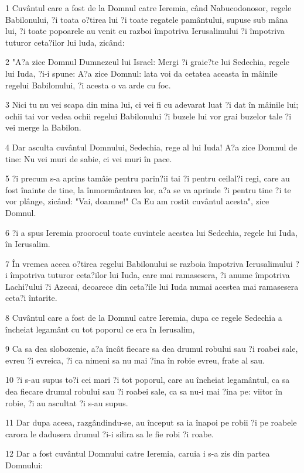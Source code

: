 \par 1 Cuvântul care a fost de la Domnul catre Ieremia, când Nabucodonosor, regele Babilonului, ?i toata o?tirea lui ?i toate regatele pamântului, supuse sub mâna lui, ?i toate popoarele au venit cu razboi împotriva Ierusalimului ?i împotriva tuturor ceta?ilor lui luda, zicând:
\par 2 "A?a zice Domnul Dumnezeul lui Israel: Mergi ?i graie?te lui Sedechia, regele lui Iuda, ?i-i spune: A?a zice Domnul: lata voi da cetatea aceasta în mâinile regelui Babilonului, ?i acesta o va arde cu foc.
\par 3 Nici tu nu vei scapa din mina lui, ci vei fi cu adevarat luat ?i dat în mâinile lui; ochii tai vor vedea ochii regelui Babilonului ?i buzele lui vor grai buzelor tale ?i vei merge la Babilon.
\par 4 Dar asculta cuvântul Domnului, Sedechia, rege al lui Iuda! A?a zice Domnul de tine: Nu vei muri de sabie, ci vei muri în pace.
\par 5 ?i precum s-a aprins tamâie pentru parin?ii tai ?i pentru ceilal?i regi, care au fost înainte de tine, la înmormântarea lor, a?a se va aprinde ?i pentru tine ?i te vor plânge, zicând: "Vai, doamne!" Ca Eu am rostit cuvântul acesta", zice Domnul.
\par 6 ?i a spus Ieremia proorocul toate cuvintele acestea lui Sedechia, regele lui Iuda, în Ierusalim.
\par 7 În vremea aceea o?tirea regelui Babilonului se razboia împotriva Ierusalimului ?i împotriva tuturor ceta?ilor lui Iuda, care mai ramasesera, ?i anume împotriva Lachi?ului ?i Azecai, deoarece din ceta?ile lui Iuda numai acestea mai ramasesera ceta?i întarite.
\par 8 Cuvântul care a fost de la Domnul catre Ieremia, dupa ce regele Sedechia a încheiat legamânt cu tot poporul ce era în Ierusalim,
\par 9 Ca sa dea slobozenie, a?a încât fiecare sa dea drumul robului sau ?i roabei sale, evreu ?i evreica, ?i ca nimeni sa nu mai ?ina în robie evreu, frate al sau.
\par 10 ?i s-au supus to?i cei mari ?i tot poporul, care au încheiat legamântul, ca sa dea fiecare drumul robului sau ?i roabei sale, ca sa nu-i mai ?ina pe: viitor în robie, ?i au ascultat ?i s-au supus.
\par 11 Dar dupa aceea, razgândindu-se, au început sa ia înapoi pe robii ?i pe roabele carora le dadusera drumul ?i-i silira sa le fie robi ?i roabe.
\par 12 Dar a fost cuvântul Domnului catre Ieremia, caruia i s-a zis din partea Domnului:
